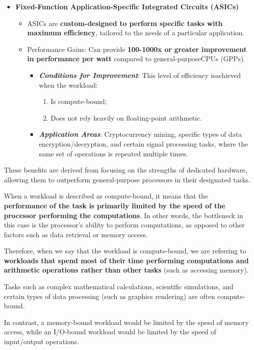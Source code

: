 \begin{itemize}[label=\textcolor{Green3}{}]
    \item \textcolor{Green3}{\textbf{Fixed-Function Application-Specific Integrated Circuits (ASICs)}}
    \begin{itemize}
        \item[\textcolor{Green3}{\faIcon{book}}] ASICs are \textbf{custom-designed to perform specific tasks with maximum efficiency}, tailored to the needs of a particular application.
        \item[\textcolor{Green3}{\faIcon{tachometer-alt}}] Performance Gains: Can provide \textbf{100-1000x or greater improvement in performance per watt} compared to general-purpose\break CPUs (GPPs).
        \begin{itemize}
            \item \textbf{\emph{Conditions for Improvement}}: This level of efficiency is\break achieved when the workload:
            \begin{enumerate}
                \item Is compute-bound;
                \item Does not rely heavily on floating-point arithmetic.
            \end{enumerate}
            \item \textbf{\emph{Application Areas}}: Cryptocurrency mining, specific types of data encryption/decryption, and certain signal processing tasks, where the same set of operations is repeated multiple times.
        \end{itemize}
    \end{itemize}
\end{itemize}
These benefits are derived from focusing on the strengths of dedicated hardware, allowing them to outperform general-purpose processors in their designated tasks.

\begin{remarkbox}
    When a workload is described as compute-bound, it means that the \textbf{performance of the task is primarily limited by the speed of the processor performing the computations}. In other words, the bottleneck in this case is the processor's ability to perform computations, as opposed to other factors such as data retrieval or memory access.

    \highspace
    Therefore, when we say that the workload is compute-bound, we are referring to \textbf{workloads that spend most of their time performing computations and arithmetic operations rather than other tasks} (such as accessing memory).

    \highspace
    Tasks such as complex mathematical calculations, scientific simulations, and certain types of data processing (such as graphics rendering) are often compute-bound.

    \highspace
    In contrast, a memory-bound workload would be limited by the speed of memory access, while an I/O-bound workload would be limited by the speed of input/output operations.
\end{remarkbox}

